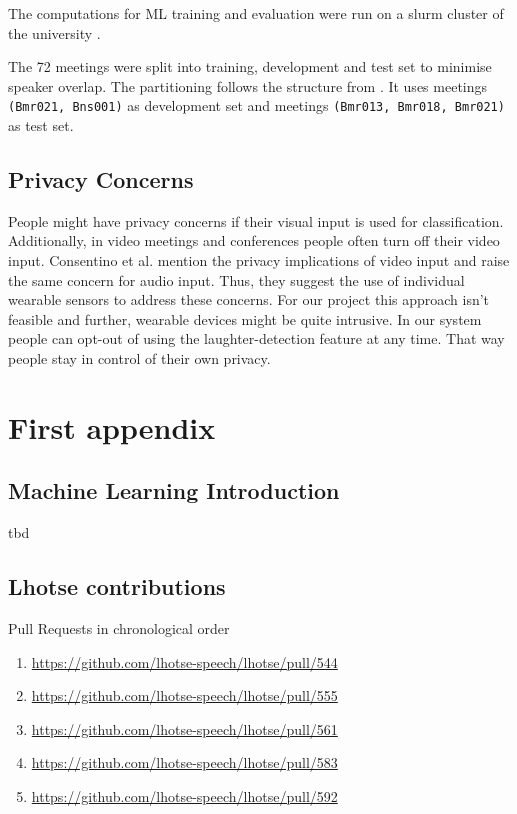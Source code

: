 \documentclass[bsc,frontabs,parskip,deptreport]{infthesis}
\begin{document}
The computations for ML training and evaluation were run on a slurm cluster of the university \citep{yoo2003slurm, tange2011gnu}.

The 72 meetings were split into training, development and test set to minimise speaker overlap. The partitioning follows the structure from \citeauthor{renals2014neural}. It uses meetings \texttt{(Bmr021, Bns001)} as development set and meetings \texttt{(Bmr013, Bmr018, Bmr021)} as test set.


\section{Privacy Concerns}\label{privacy-concerns}
People might have privacy concerns if their visual input is used for classification.
Additionally, in video meetings and conferences people often turn off their video input.
Consentino et al. \citep{cosentino2016quantitative}  mention the privacy implications of video input and raise the same concern for audio input.
Thus, they suggest the use of individual wearable sensors to address these concerns.
For our project this approach isn't feasible and further, wearable devices might be quite intrusive.
In our system people can opt-out of using the laughter-detection feature at any time.
That way people stay in control of their own privacy.




\appendix
\chapter{First appendix}
\section{Machine Learning Introduction}\label{sec:ml-intro}
tbd 

\section{Lhotse contributions}
Pull Requests in chronological order 
\begin{enumerate}
    \item \url{https://github.com/lhotse-speech/lhotse/pull/544}
    \item \url{https://github.com/lhotse-speech/lhotse/pull/555}
    \item \url{https://github.com/lhotse-speech/lhotse/pull/561}
    \item \url{https://github.com/lhotse-speech/lhotse/pull/583}
    \item \url{https://github.com/lhotse-speech/lhotse/pull/592}
\end{enumerate}
%
\end{document}
